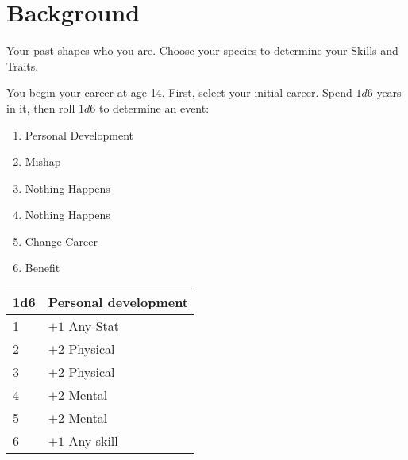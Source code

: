 \documentclass[itdr/core]{subfiles}
\begin{document}
\section{Background}
Your past shapes who you are. Choose your species to determine your Skills and Traits.

You begin your career at age 14. First, select your initial career. Spend \(1d6\) years in it, then roll \(1d6\) to determine an event:

\begin{enumerate}
    \item Personal Development
    \item Mishap
    \item Nothing Happens
    \item Nothing Happens
    \item Change Career
    \item Benefit
\end{enumerate}
\begin{longtable}{p{}p{}}
    \hline
    \textbf{1d6} & \textbf{Personal development} \\
    \hline
    1 & $+1$ Any Stat \\ 
    2 & $+2$ Physical \\ 
    3 & $+2$ Physical \\ 
    4 & $+2$ Mental \\ 
    5 & $+2$ Mental \\ 
    6 & $+1$ Any skill \\
    \hline
\end{longtable}
\end{document}
